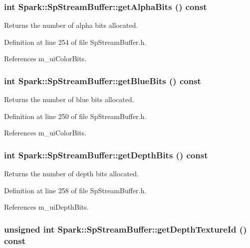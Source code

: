 \subsubsection{\setlength{\rightskip}{0pt plus 5cm}int Spark::Sp\-Stream\-Buffer::get\-Alpha\-Bits () const\hspace{0.3cm}{\tt  [inline]}}\label{classSpark_1_1SpStreamBuffer_a26}


Returns the number of alpha bits allocated. 

Definition at line 254 of file Sp\-Stream\-Buffer.h.

References m\_\-ui\-Color\-Bits.
\subsubsection{\setlength{\rightskip}{0pt plus 5cm}int Spark::Sp\-Stream\-Buffer::get\-Blue\-Bits () const\hspace{0.3cm}{\tt  [inline]}}\label{classSpark_1_1SpStreamBuffer_a25}


Returns the number of blue bits allocated. 

Definition at line 250 of file Sp\-Stream\-Buffer.h.

References m\_\-ui\-Color\-Bits.
\subsubsection{\setlength{\rightskip}{0pt plus 5cm}int Spark::Sp\-Stream\-Buffer::get\-Depth\-Bits () const\hspace{0.3cm}{\tt  [inline]}}\label{classSpark_1_1SpStreamBuffer_a27}


Returns the number of depth bits allocated. 

Definition at line 258 of file Sp\-Stream\-Buffer.h.

References m\_\-ui\-Depth\-Bits.
\subsubsection{\setlength{\rightskip}{0pt plus 5cm}unsigned int Spark::Sp\-Stream\-Buffer::get\-Depth\-Texture\-Id () const\hspace{0.3cm}{\tt  [inline]}}\label{classSpark_1_1SpStreamBuffer_a16}


